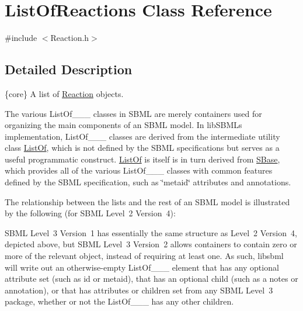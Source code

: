 \hypertarget{class_list_of_reactions}{}\section{List\+Of\+Reactions Class Reference}
\label{class_list_of_reactions}


{\ttfamily \#include $<$Reaction.\+h$>$}



\subsection{Detailed Description}
\{core\} A list of \hyperlink{class_reaction}{Reaction} objects.

\begin{DoxyParagraph}{}
The various List\+Of\+\_\+\+\_\+\+\_\+ classes in S\+B\+ML are merely containers used for organizing the main components of an S\+B\+ML model. In lib\+S\+B\+ML\textquotesingle{}s implementation, List\+Of\+\_\+\+\_\+\+\_\+ classes are derived from the intermediate utility class \hyperlink{class_list_of}{List\+Of}, which is not defined by the S\+B\+ML specifications but serves as a useful programmatic construct. \hyperlink{class_list_of}{List\+Of} is itself is in turn derived from \hyperlink{class_s_base}{S\+Base}, which provides all of the various List\+Of\+\_\+\+\_\+\+\_\+ classes with common features defined by the S\+B\+ML specification, such as \char`\"{}metaid\char`\"{} attributes and annotations.
\end{DoxyParagraph}
The relationship between the lists and the rest of an S\+B\+ML model is illustrated by the following (for S\+B\+ML Level~2 Version~4)\+:



S\+B\+ML Level~3 Version~1 has essentially the same structure as Level~2 Version~4, depicted above, but S\+B\+ML Level~3 Version~2 allows containers to contain zero or more of the relevant object, instead of requiring at least one. As such, libsbml will write out an otherwise-\/empty List\+Of\+\_\+\+\_\+\+\_\+ element that has any optional attribute set (such as \textquotesingle{}id\textquotesingle{} or \textquotesingle{}metaid\textquotesingle{}), that has an optional child (such as a \textquotesingle{}notes\textquotesingle{} or \textquotesingle{}annotation\textquotesingle{}), or that has attributes or children set from any S\+B\+ML Level~3 package, whether or not the List\+Of\+\_\+\+\_\+\+\_\+ has any other children.

